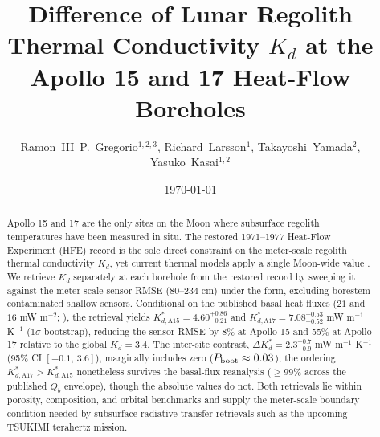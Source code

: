 \documentclass[11pt]{article}
\title{\bfseries  Difference of Lunar Regolith Thermal Conductivity $K_d$ at the Apollo 15 and 17 Heat-Flow Boreholes}
\author{%
  Ramon~III~P.~Gregorio$^{1,2,3}$,\quad
  Richard~Larsson$^{1}$,\quad
  Takayoshi~Yamada$^{2}$,\quad
  Yasuko~Kasai$^{1,2}$%
}
\date{\today}
\begin{document}
\linenumbers
\maketitle



\begin{abstract}
\noindent
Apollo 15 and 17 are the only sites on the Moon where subsurface
regolith temperatures have been measured in situ. The restored
1971--1977 Heat-Flow Experiment (HFE) record is the sole direct
constraint on the meter-scale regolith thermal conductivity $K_d$, yet
current thermal models apply a single Moon-wide value
\citep{hayne2017,martinez2021}. We retrieve $K_d$ separately at each
borehole from the restored record \citep{nagihara2018} by sweeping it
against the meter-scale-sensor RMSE (80--234 cm) under the
\citet{hayne2017} form, excluding borestem-contaminated shallow
sensors. Conditional on the published basal heat fluxes ($21$ and $16$
mW m$^{-2}$; \citealp{langseth1976}), the retrieval yields
$K_{d,\mathrm{A15}}^{*}=4.60^{+0.86}_{-0.21}$ and
$K_{d,\mathrm{A17}}^{*}=7.08^{+0.53}_{-0.52}$ mW m$^{-1}$ K$^{-1}$
($1\sigma$ bootstrap), reducing the sensor RMSE by 8\% at Apollo 15 and
55\% at Apollo 17 relative to the global $K_d=3.4$. The inter-site
contrast, $\Delta K_d^{*}=2.3^{+0.7}_{-0.9}$ mW m$^{-1}$ K$^{-1}$ (95\%
CI $[-0.1,\,3.6]$), marginally includes zero
($P_{\rm boot}\approx 0.03$); the ordering
$K_{d,\mathrm{A17}}^{*}\!>\!K_{d,\mathrm{A15}}^{*}$ nonetheless survives
the basal-flux reanalysis ($\ge$99\% across the published $Q_b$
envelope), though the absolute values do not. Both retrievals lie
within porosity, composition, and orbital benchmarks and supply the
meter-scale boundary condition needed by subsurface radiative-transfer
retrievals such as the upcoming TSUKIMI terahertz mission.
\end{abstract}
\end{document}
